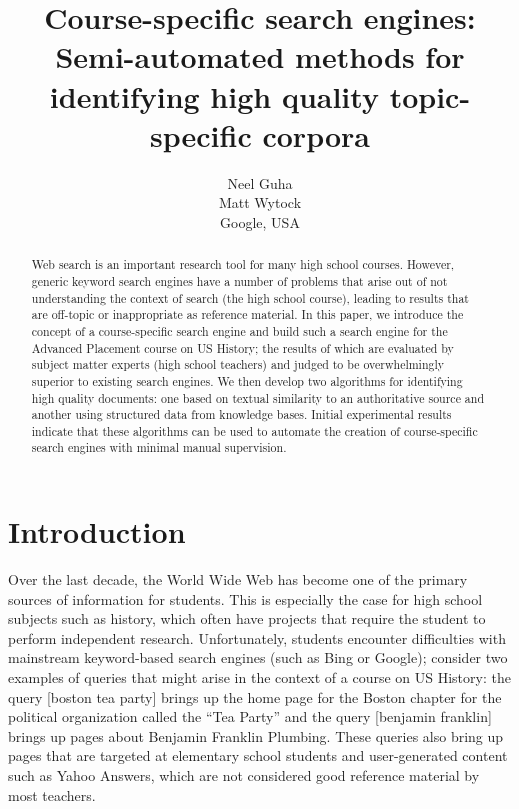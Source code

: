 \documentclass[pdfpagelabels=false,plainpages=true]{acm_proc_article-sp}
\begin{document}
\title{Course-specific search engines: Semi-automated methods for identifying
  high quality topic-specific corpora} 

\author{
  \alignauthor
  Neel Guha \\
  \alignauthor
  Matt Wytock \\
  Google, USA
}

\maketitle
\begin{abstract}
Web search is an important research tool for many high school courses. However,
generic keyword search engines have a number of problems that arise out of
not understanding the context of search (the high school course),
leading to results that are off-topic or inappropriate as reference material. In
this paper, we introduce the concept of a course-specific search 
engine and build such a search engine for the Advanced Placement course on US
History; the results of which are evaluated by subject matter experts (high
school teachers) and judged to be overwhelmingly superior to existing search engines. We
then develop two algorithms for identifying high quality documents: one 
based on textual similarity to an authoritative source and another using structured
data from knowledge bases. Initial experimental results indicate that
these algorithms can be used to automate the creation of course-specific search
engines with minimal manual supervision.
\end{abstract}

\section{Introduction}

Over the last decade, the World Wide Web has become one of the primary sources
of information for students. This is especially the case for high school
subjects such as history, which often have projects that require the student to 
perform independent research. Unfortunately, students encounter difficulties
with mainstream keyword-based search engines (such as Bing or Google); 
consider two examples of queries that might arise in the context of a course
on US History: the query [boston tea party] brings up the home page for the
Boston chapter for the political organization called the ``Tea Party'' and the
query [benjamin franklin] brings up pages about Benjamin Franklin
Plumbing. These queries also bring up pages that are targeted at elementary
school students and user-generated content such as Yahoo Answers, which are not
considered good reference material by most teachers.
\end{document}
